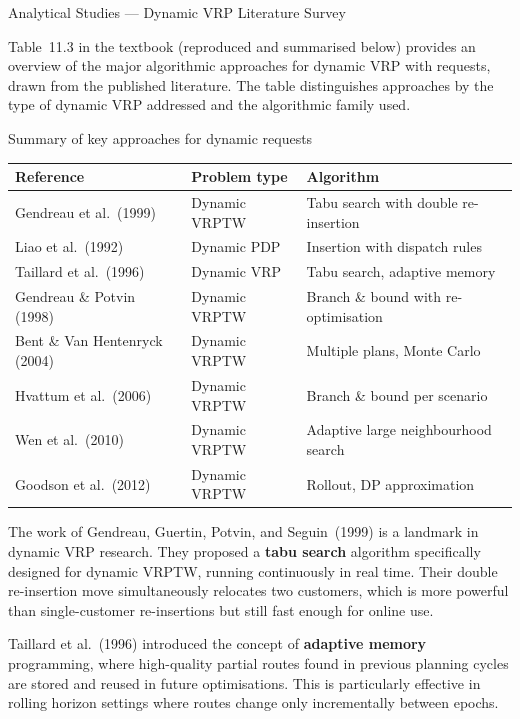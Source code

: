 \documentclass[aspectratio=169,10pt]{beamer}
\begin{document}
\begin{frame}[allowframebreaks]{Analytical Studies — Dynamic VRP Literature Survey}

  Table~11.3 in the textbook (reproduced and summarised below) provides an
  overview of the major algorithmic approaches for dynamic VRP with requests,
  drawn from the published literature.  The table distinguishes approaches by
  the type of dynamic VRP addressed and the algorithmic family used.

  \begin{block}{Summary of key approaches for dynamic requests}
    \begin{tabular}{p{3.8cm}p{4.0cm}p{5.5cm}}
      \toprule
      Reference & Problem type & Algorithm\\
      \midrule
      Gendreau et al.\ (1999) & Dynamic VRPTW & Tabu search with double re-insertion\\
      Liao et al.\ (1992) & Dynamic PDP & Insertion with dispatch rules\\
      Taillard et al.\ (1996) & Dynamic VRP & Tabu search, adaptive memory\\
      Gendreau \& Potvin (1998) & Dynamic VRPTW & Branch \& bound with re-optimisation\\
      Bent \& Van Hentenryck (2004) & Dynamic VRPTW & Multiple plans, Monte Carlo\\
      Hvattum et al.\ (2006) & Dynamic VRPTW & Branch \& bound per scenario\\
      Wen et al.\ (2010) & Dynamic VRPTW & Adaptive large neighbourhood search\\
      Goodson et al.\ (2012) & Dynamic VRPTW & Rollout, DP approximation\\
      \bottomrule
    \end{tabular}
  \end{block}

  \framebreak

  The work of Gendreau, Guertin, Potvin, and Seguin~(1999) is a landmark in
  dynamic VRP research.  They proposed a \textbf{tabu search} algorithm
  specifically designed for dynamic VRPTW, running continuously in real time.
  Their double re-insertion move simultaneously relocates two customers,
  which is more powerful than single-customer re-insertions but still fast
  enough for online use.

  Taillard et al.~(1996) introduced the concept of \textbf{adaptive memory}
  programming, where high-quality partial routes found in previous planning
  cycles are stored and reused in future optimisations.  This is particularly
  effective in rolling horizon settings where routes change only incrementally
  between epochs.


\end{frame}
\end{document}
